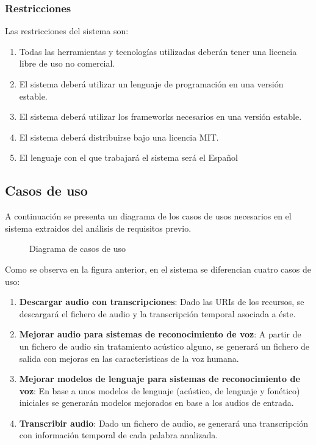 \documentclass[../main.tex]{subfiles}
\begin{document}
\subsubsection{Restricciones}\label{subsubsec:restricciones}
Las restricciones del sistema son:
\begin{enumerate}
    \item Todas las herramientas y tecnologías utilizadas deberán tener una licencia libre de uso no comercial.
    \item El sistema deberá utilizar un lenguaje de programación en una versión estable.
    \item El sistema deberá utilizar los frameworks necesarios en una versión estable.
    \item El sistema deberá distribuirse bajo una licencia MIT.
    \item El lenguaje con el que trabajará el sistema será el Español
\end{enumerate}

\subsection{Casos de uso}\label{subsec:casos_uso}
A continuación se presenta un diagrama de los casos de usos necesarios en el sistema extraidos del análisis de requisitos previo.

\begin{figure}[H]
    \centering
    
    \label{fig:casos_uso}
    \caption{Diagrama de casos de uso}
\end{figure}

Como se observa en la figura anterior, en el sistema se diferencian cuatro casos de uso:
\begin{enumerate}
    \item \textbf{Descargar audio con transcripciones}: Dado las URIs de los recursos, se descargará el fichero de audio y la transcripción temporal asociada a éste.
    \item \textbf{Mejorar audio para sistemas de reconocimiento de voz}: A partir de un fichero de audio sin tratamiento acústico alguno, 
    se generará un fichero de salida con mejoras en las características de la voz humana.
    \item \textbf{Mejorar modelos de lenguaje para sistemas de reconocimiento de voz}: En base a unos modelos de lenguaje (acústico, de lenguaje y fonético) iniciales se generarán modelos
    mejorados en base a los audios de entrada.
    \item \textbf{Transcribir audio}: Dado un fichero de audio, se generará una transcripción con información temporal de cada palabra analizada.
\end{enumerate}
\end{document}
